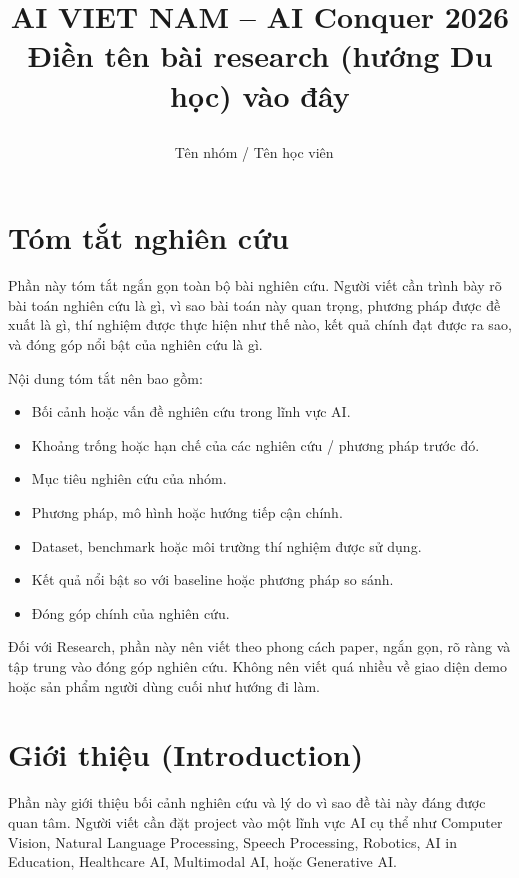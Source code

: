 \documentclass[12pt]{ai_conquer2026}
\title{%
  \begin{center}
        \Large {AI VIET NAM -- AI Conquer 2026}\\[.5ex]  
        \Huge \textbf{Điền tên bài research (hướng Du học) vào đây}\\[.5ex]
  \end{center}
}
\author{
\begin{minipage}{\textwidth}
\centering
{
\vspace{-1.5em}
Tên nhóm / Tên học viên
}\
\end{minipage}
}
\date{}
\begin{document}
\maketitle
\vspace{-5.5em}
\setlength{\epigraphwidth}{0.6\textwidth}

\section{Tóm tắt nghiên cứu}

Phần này tóm tắt ngắn gọn toàn bộ bài nghiên cứu. Người viết cần trình bày rõ bài toán nghiên cứu là gì, vì sao bài toán này quan trọng, phương pháp được đề xuất là gì, thí nghiệm được thực hiện như thế nào, kết quả chính đạt được ra sao, và đóng góp nổi bật của nghiên cứu là gì.

Nội dung tóm tắt nên bao gồm:
\begin{itemize}
\item Bối cảnh hoặc vấn đề nghiên cứu trong lĩnh vực AI.
\item Khoảng trống hoặc hạn chế của các nghiên cứu / phương pháp trước đó.
\item Mục tiêu nghiên cứu của nhóm.
\item Phương pháp, mô hình hoặc hướng tiếp cận chính.
\item Dataset, benchmark hoặc môi trường thí nghiệm được sử dụng.
\item Kết quả nổi bật so với baseline hoặc phương pháp so sánh.
\item Đóng góp chính của nghiên cứu.
\end{itemize}

Đối với Research, phần này nên viết theo phong cách paper, ngắn gọn, rõ ràng và tập trung vào đóng góp nghiên cứu. Không nên viết quá nhiều về giao diện demo hoặc sản phẩm người dùng cuối như hướng đi làm.

\newpage
\setcounter{tocdepth}{2}
\tableofcontents
\thispagestyle{fancy}

\newpage
\section{Giới thiệu (Introduction)}

Phần này giới thiệu bối cảnh nghiên cứu và lý do vì sao đề tài này đáng được quan tâm. Người viết cần đặt project vào một lĩnh vực AI cụ thể như Computer Vision, Natural Language Processing, Speech Processing, Robotics, AI in Education, Healthcare AI, Multimodal AI, hoặc Generative AI.
\end{document}

